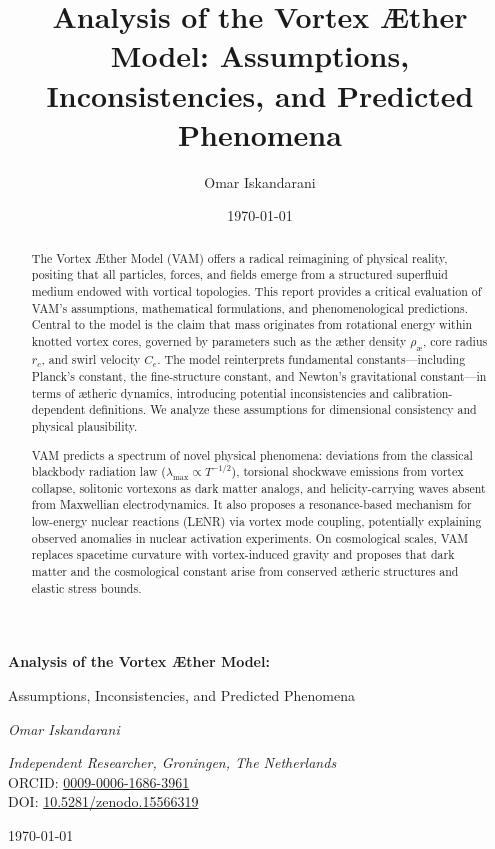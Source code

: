 \documentclass[a4paper,12pt]{article}
\title{Analysis of the Vortex Æther Model: Assumptions, Inconsistencies, and Predicted Phenomena}
\author{Omar Iskandarani}
\date{\today}
\begin{document}
\begin{titlepage}
    \thispagestyle{empty}
    \centering
    \vspace*{2cm}
    {\Huge\bfseries Analysis of the Vortex Æther Model:  \par}
    \vspace{0.5cm}
    {\Large Assumptions, Inconsistencies, and Predicted Phenomena \par}
    \vspace{2cm}
    {\Large\itshape Omar Iskandarani\par}
    \vspace{0.5cm}
    \textit{Independent Researcher, Groningen, The Netherlands} \\
    ORCID: \href{https://orcid.org/0009-0006-1686-3961}{0009-0006-1686-3961} \\
    DOI: \href{https://doi.org/10.5281/zenodo.15566319}{10.5281/zenodo.15566319} \\
 \vspace{0.5cm}
    {\large \today\par}
\vspace{0.5cm}
\begin{abstract}
The Vortex Æther Model (VAM) offers a radical reimagining of physical reality, positing that all particles, forces, and fields emerge from a structured superfluid medium endowed with vortical topologies. This report provides a critical evaluation of VAM’s assumptions, mathematical formulations, and phenomenological predictions. Central to the model is the claim that mass originates from rotational energy within knotted vortex cores, governed by parameters such as the æther density $\rho_{\text{\ae}}$, core radius $r_c$, and swirl velocity $C_e$. The model reinterprets fundamental constants---including Planck’s constant, the fine-structure constant, and Newton’s gravitational constant---in terms of ætheric dynamics, introducing potential inconsistencies and calibration-dependent definitions. We analyze these assumptions for dimensional consistency and physical plausibility.

VAM predicts a spectrum of novel physical phenomena: deviations from the classical blackbody radiation law ($\lambda_{\text{max}} \propto T^{-1/2}$), torsional shockwave emissions from vortex collapse, solitonic vortexons as dark matter analogs, and helicity-carrying waves absent from Maxwellian electrodynamics. It also proposes a resonance-based mechanism for low-energy nuclear reactions (LENR) via vortex mode coupling, potentially explaining observed anomalies in nuclear activation experiments. On cosmological scales, VAM replaces spacetime curvature with vortex-induced gravity and proposes that dark matter and the cosmological constant arise from conserved ætheric structures and elastic stress bounds.


\end{abstract}
\end{titlepage}
\end{document}
